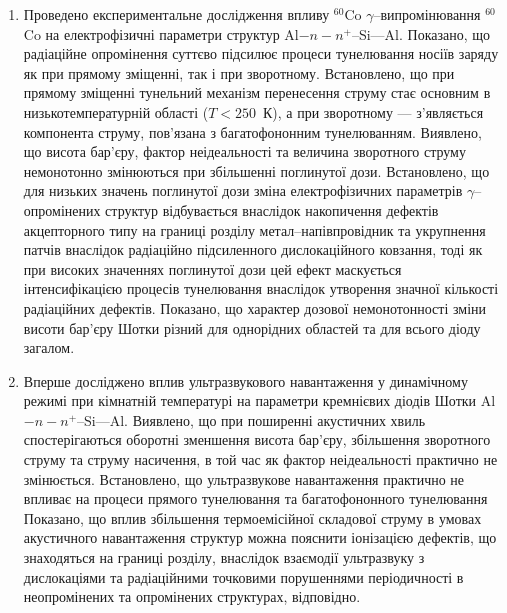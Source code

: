 \begin{enumerate}
\item Проведено експериментальне дослідження впливу $^{60}$Co $\gamma$--ви\-про\-мі\-ню\-ван\-ня $^{60}$Co на електрофізичні параметри структур Al$-n-n^+$--Si---Al.
     Показано, що радіаційне опромінення суттєво підсилює процеси тунелювання носіїв заряду як при прямому зміщенні, так і при зворотному.
     Встановлено, що при прямому зміщенні тунельний механізм перенесення струму стає основним в низькотемпературній області ($T<250$~К),
а при зворотному --- з'являється компонента струму, пов'язана з багатофононним тунелюванням.
 Виявлено, що висота бар'єру, фактор неідеальності та величина зворотного струму немонотонно змінюються при збільшенні поглинутої дози.
Встановлено, що для низьких значень поглинутої дози зміна електрофізичних параметрів $\gamma$--оп\-ро\-мі\-не\-них структур
відбувається внаслідок накопичення дефектів акцепторного типу на границі розділу
метал--напівпровідник та укрупнення патчів внаслідок радіаційно підсиленного дислокаційного ковзання, тоді як при високих значеннях поглинутої дози
цей ефект маскується інтенсифікацією процесів тунелювання внаслідок утворення значної кількості радіаційних дефектів.
Показано, що характер дозової немонотонності зміни висоти бар'єру Шотки різний для   однорідних областей та для всього діоду загалом.

\item
Вперше досліджено вплив ультразвукового навантаження у динамічному режимі при кімнатній температурі на параметри кремнієвих діодів Шотки Al$-n-n^+$--Si---Al.
Виявлено, що при поширенні акустичних хвиль спостерігаються оборотні зменшення висота бар'єру,
збільшення зворотного струму та струму насичення, в той час як фактор неідеальності практично не змінюється.
Встановлено, що ультразвукове навантаження практично не впливає на процеси прямого тунелювання та багатофононного тунелювання
Показано, що вплив збільшення термоемісійної складової струму в умовах акустичного навантаження структур можна пояснити іонізацією дефектів, що знаходяться на границі розділу,
  внаслідок взаємодії ультразвуку з дислокаціями та радіаційними точковими порушеннями періодичності в неопромінених та опромінених структурах, відповідно.


\end{enumerate}
